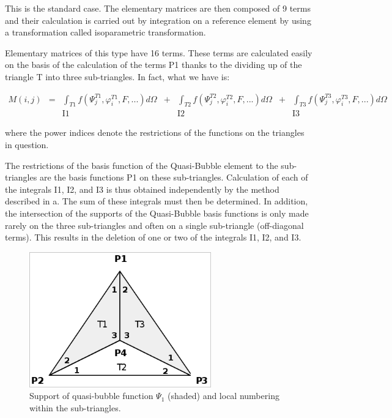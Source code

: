 This is the standard case. The elementary matrices are then composed of 9 terms
and their calculation is carried out by integration on a reference element by
using a transformation called isoparametric transformation.


Elementary matrices of this type have 16 terms. These terms are calculated
easily on the basis of the calculation of the terms P1 thanks to the dividing
up of the triangle T into three sub-triangles. In fact, what we have is:

\[
\begin{array}{ccccccc}
M(i,j) & = & \int _{T1}f(\Psi _{j}^{T1} ,\varphi _{i}^{T1} ,F,...)d\Omega & + & \int _{T2}f(\Psi _{j}^{T2} ,\varphi _{i}^{T2} ,F,...)d\Omega & + & \int _{T3}f(\Psi _{j}^{T3} ,\varphi _{i}^{T3} ,F,...)d\Omega \\
       &   &   \mathrm{I1}                                                         &   &    \mathrm{I2}                                                        &   &   \mathrm{I3}
\end{array}
\]

where the power indices denote the restrictions of the functions on the
triangles in question.

The restrictions of the basis function of the Quasi-Bubble element to the
sub-triangles are the basis functions P1 on these sub-triangles. Calculation of
each of the integrals I1, I2, and I3 is thus obtained independently by the
method described in a. The sum of these integrals must then be determined. In
addition, the intersection of the supports of the Quasi-Bubble basis functions
is only made rarely on the three sub-triangles and often on a single
sub-triangle (off-diagonal terms). This results in the deletion of one or two
of the integrals I1, I2, and I3.

\begin{figure}[H]%
\begin{center}
%
  \includegraphics[width=0.7\textwidth]{./graphics/quasi-bubble-support}
%
\end{center}
\caption{Support of quasi-bubble function $\Psi _{1}$ (shaded) and local
numbering within the sub-triangles.}
\label{fig:quasibubblesupport}
\end{figure}


